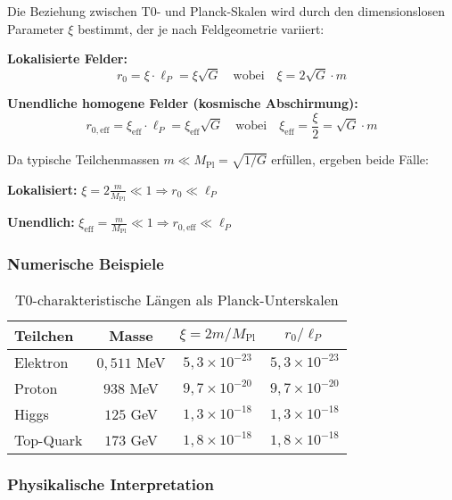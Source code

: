 \documentclass[12pt,a4paper]{article}
\begin{document}
Die Beziehung zwischen T0- und Planck-Skalen wird durch den dimensionslosen Parameter $\xi$ bestimmt, der je nach Feldgeometrie variiert:

\textbf{Lokalisierte Felder:}
\begin{equation}
	r_0 = \xi \cdot \ell_P = \xi \sqrt{G} \quad \text{wobei} \quad \xi = 2\sqrt{G} \cdot m
\end{equation}

\textbf{Unendliche homogene Felder (kosmische Abschirmung):}
\begin{equation}
	r_{0,\text{eff}} = \xi_{\text{eff}} \cdot \ell_P = \xi_{\text{eff}} \sqrt{G} \quad \text{wobei} \quad \xi_{\text{eff}} = \frac{\xi}{2} = \sqrt{G} \cdot m
\end{equation}

Da typische Teilchenmassen $m \ll M_{\text{Pl}} = \sqrt{1/G}$ erfüllen, ergeben beide Fälle:

\textbf{Lokalisiert:} $\xi = 2\frac{m}{M_{\text{Pl}}} \ll 1 \Rightarrow r_0 \ll \ell_P$

\textbf{Unendlich:} $\xi_{\text{eff}} = \frac{m}{M_{\text{Pl}}} \ll 1 \Rightarrow r_{0,\text{eff}} \ll \ell_P$

\subsubsection{Numerische Beispiele}
\label{subsubsec:numerical_examples}

\begin{table}[htbp]
	\centering
	\begin{tabular}{|l|c|c|c|}
		\hline
		\textbf{Teilchen} & \textbf{Masse} & \textbf{$\xi = 2m/M_{\text{Pl}}$} & \textbf{$r_0/\ell_P$} \\
		\hline
		Elektron & $0,511$ MeV & $5,3 \times 10^{-23}$ & $5,3 \times 10^{-23}$ \\
		Proton & $938$ MeV & $9,7 \times 10^{-20}$ & $9,7 \times 10^{-20}$ \\
		Higgs & $125$ GeV & $1,3 \times 10^{-18}$ & $1,3 \times 10^{-18}$ \\
		Top-Quark & $173$ GeV & $1,8 \times 10^{-18}$ & $1,8 \times 10^{-18}$ \\
		\hline
	\end{tabular}
	\caption{T0-charakteristische Längen als Planck-Unterskalen}
\end{table}

\subsubsection{Physikalische Interpretation}
\label{subsubsec:physical_interpretation}
\end{document}
